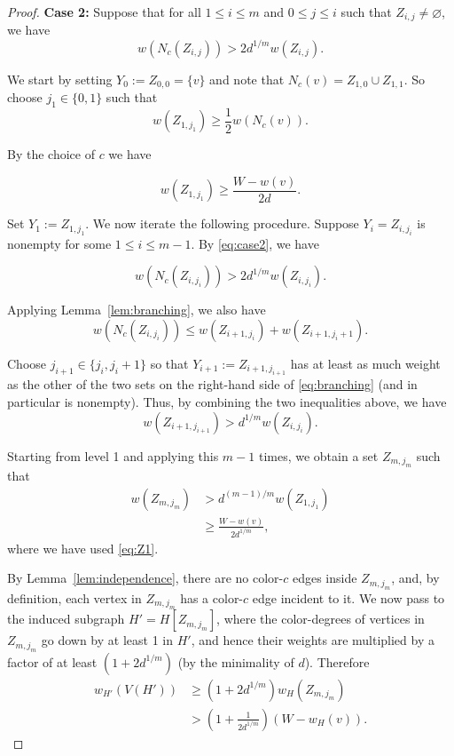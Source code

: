 \documentclass[10pt,a4paper]{amsart}
\begin{document}
\begin{proof}
\textbf{Case 2:} Suppose that for all \( 1\leq i\leq m\) and \(0\leq j \leq i\) such that \(Z_{i,j}\neq\varnothing\), we have
\begin{equation} \label{eq:case2}
 w(N_{c}(Z_{i,j})) > 2 d^{1/m} w(Z_{i,j}).
\end{equation}

We start by setting \(Y_{0}:=Z_{0,0}=\{v\}\) and note that
\(N_{c}(v)=Z_{1,0} \cup Z_{1,1}\). So choose \(j_{1}\in \{ 0,1 \}\)
such that \[
 w(Z_{1,j_{1} })\geq \frac{1}{2} w(N_{c}(v)). \]

By the choice of \(c\) we have

\begin{equation}
 w(Z_{1,j_1})\geq \frac{W-w(v)}{2d}.
\label{eq:Z1}
\end{equation}

Set $Y_1 := Z_{1,j_1}$. We now iterate the following procedure. Suppose \(Y_i=Z_{i,j_i}\) is
nonempty for some \(1\leq i\leq m-1\). By \eqref{eq:case2}, we have

\begin{equation*}
w(N_c(Z_{i,j_i})) > 2 d^{1/m}w(Z_{i,j_i}).
\end{equation*}

Applying Lemma~\ref{lem:branching}, we also have
\begin{equation}\label{eq:branching}
    w(N_{c}(Z_{i,j_{i}})) \leq w(Z_{i+1,j_{i}})+w(Z_{i+1,j_{i}+1}).
\end{equation}

Choose \(j_{i+1}\in\{j_i,j_i+1\}\) so that
\(Y_{i+1}:=Z_{i+1,j_{i+1}}\) has at least as much weight as the other of the two
sets on the right-hand side of \eqref{eq:branching} (and in particular is nonempty). Thus, by combining
the two inequalities above, we have 
\[
 w(Z_{i+1,j_{i+1}}) > d^{1/m} w(Z_{i,j_{i}}).
 \]

Starting from level 1 and applying this \(m-1\) times, we obtain a set
\(Z_{m,j_{m}}\) such that
\begin{align*} 
w(Z_{m,j_{m}})  & >  d^{(m-1)/m}w(Z_{1,j_{1}})  \\
 & \geq \frac{W-w(v)}{2d^{1/m}},
\end{align*}
where we have used \eqref{eq:Z1}.

By Lemma~\ref{lem:independence}, there are no color-\(c\) edges inside
\(Z_{m,j_m}\), and, by definition, each vertex in \(Z_{m,j_m}\) has a color-\(c\) edge incident to it. We now pass to the induced subgraph \(H'=H[Z_{m,j_m}]\), where the color-degrees of vertices in \(Z_{m,j_m}\)
go down by at least 1 in $H'$, and hence their weights are multiplied by a factor of at least $(1+2d^{1/m})$ (by the minimality of $d$). Therefore
\begin{align*}
  w_{H'}(V(H'))  & \geq (1+2d^{1/m}) w_{H}(Z_{m,j_m})  \\
   & > \left(1 + \frac{1}{2 d^{1/m}}\right) (W-w_{H}(v)).
 \end{align*} 


\end{proof}
\end{document}
